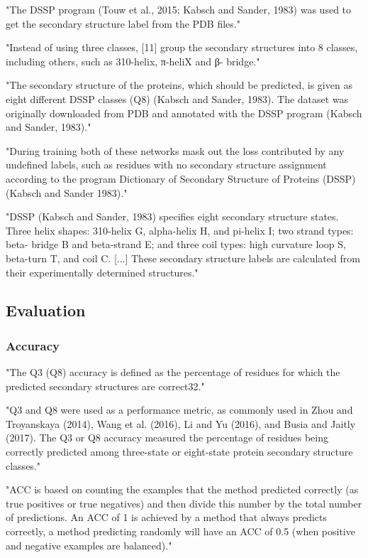 \documentclass[]{scrartcl}
\begin{document}
"The DSSP program (Touw et al., 2015; Kabsch and Sander, 1983) was used to get the secondary structure label from the PDB files." \cite{Fang2017}

"Instead of using three classes, [11] group the secondary structures into 8 classes, including others, such as 310-helix, π-heliX and β- bridge." \cite{Hattori2017}

"The secondary structure of the proteins, which should be predicted, is given as eight different DSSP classes (Q8) (Kabsch and Sander, 1983). The dataset was originally downloaded from PDB and annotated with the DSSP program (Kabsch and Sander, 1983)." \cite{Jurtz2017}

"During training both of these networks mask out the loss contributed by any undefined labels, such as residues with no secondary structure assignment according to the program Dictionary of Secondary Structure of Proteins (DSSP) (Kabsch and Sander 1983)." \cite{Heffernan2017}

"DSSP (Kabsch and Sander, 1983) specifies eight secondary structure states. Three helix shapes: 310-helix G, alpha-helix H, and pi-helix I; two strand types: beta- bridge B and beta-strand E; and three coil types: high curvature loop S, beta-turn T, and coil C. [...] These secondary structure labels are calculated from their experimentally determined structures." \cite{Heffernan2017}

\subsection{Evaluation}
\subsubsection{Accuracy}
"The Q3 (Q8) accuracy is defined as the percentage of residues for which the predicted secondary structures are correct32." \cite{Wang2016}

"Q3 and Q8 were used as a performance metric, as commonly used in Zhou and Troyanskaya (2014), Wang et al. (2016), Li and Yu (2016), and Busia and Jaitly (2017). The Q3 or Q8 accuracy measured the percentage of residues being correctly predicted among three-state or eight-state protein secondary structure classes." \cite{Fang2017}

"ACC is based on counting the examples that the method predicted correctly (as true positives or true negatives) and then divide this number by the total number of predictions. An ACC of 1 is achieved by a method that always predicts correctly, a method predicting randomly will have an ACC of 0.5 (when positive and negative examples are balanced)." \cite{Jurtz2017}
\end{document}
